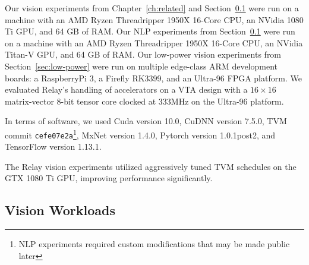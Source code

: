   Our vision experiments from Chapter~\ref{ch:related} and Section~\ref{sec:perf-gpu} were run on a machine with an AMD Ryzen
    Threadripper 1950X 16-Core CPU,
    an NVidia 1080 Ti GPU,
    and 64 GB of RAM.
  Our NLP experiments from Section~\ref{sec:perf-gpu} were run on a machine with an AMD Ryzen
    Threadripper 1950X 16-Core CPU,
    an NVidia Titan-V GPU,
    and 64 GB of RAM.
  Our low-power vision experiments from Section~\ref{sec:low-power} were run on multiple edge-class ARM development boards: a RaspberryPi 3, a Firefly RK3399, and an Ultra-96 FPGA platform.
  We evaluated Relay's handling of accelerators on a VTA design with a
    $16\times16$ matrix-vector 8-bit tensor core clocked at 333MHz on the Ultra-96 platform.

  In terms of software, we used
    Cuda version 10.0,
    CuDNN version 7.5.0,
    TVM commit \texttt{cefe07e2a}\footnote{NLP experiments required custom modifications that may be made public later},
    MxNet version 1.4.0,
    Pytorch version 1.0.1post2,
    and TensorFlow version 1.13.1.

  The Relay vision experiments utilized aggressively tuned TVM schedules on the GTX 1080 Ti GPU,
    improving performance significantly.

  \subsection{Vision Workloads}
  \label{sec:perf-gpu}

